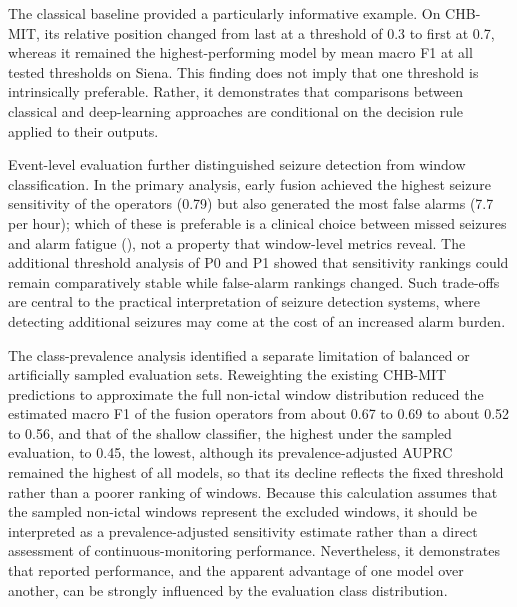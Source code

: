\documentclass[11pt,a4paper]{article}
\begin{document}
The classical baseline provided a particularly informative example. On CHB-MIT, its
relative position changed from last at a threshold of 0.3 to first at 0.7, whereas it
remained the highest-performing model by mean macro F1 at all tested thresholds on
Siena. This finding does not imply that one threshold is intrinsically preferable.
Rather, it demonstrates that comparisons between classical and deep-learning approaches
are conditional on the decision rule applied to their outputs.

Event-level evaluation further distinguished seizure detection from window
classification. In the primary analysis, early fusion achieved the highest seizure
sensitivity of the operators (0.79) but also generated the most false alarms (7.7 per
hour); which of these is preferable is a clinical choice between missed seizures and
alarm fatigue (\citealp{Sendelbach_2013}), not a property that window-level metrics
reveal. The additional threshold analysis of P0 and P1 showed that sensitivity rankings
could remain comparatively stable while false-alarm rankings changed. Such trade-offs are
central to the practical interpretation of seizure detection systems, where detecting
additional seizures may come at the cost of an increased alarm burden.

The class-prevalence analysis identified a separate limitation of balanced or
artificially sampled evaluation sets. Reweighting the existing CHB-MIT predictions to
approximate the full non-ictal window distribution reduced the estimated macro F1 of the
fusion operators from about 0.67 to 0.69 to about 0.52 to 0.56, and that of the shallow
classifier, the highest under the sampled evaluation, to 0.45, the lowest, although its prevalence-adjusted AUPRC remained the highest of all models, so that its decline reflects the fixed threshold rather than a poorer ranking of windows. Because this
calculation assumes that the sampled non-ictal windows represent the excluded windows, it
should be interpreted as a prevalence-adjusted sensitivity estimate rather than a direct
assessment of continuous-monitoring performance. Nevertheless, it demonstrates that
reported performance, and the apparent advantage of one model over another, can be
strongly influenced by the evaluation class distribution.
\end{document}
